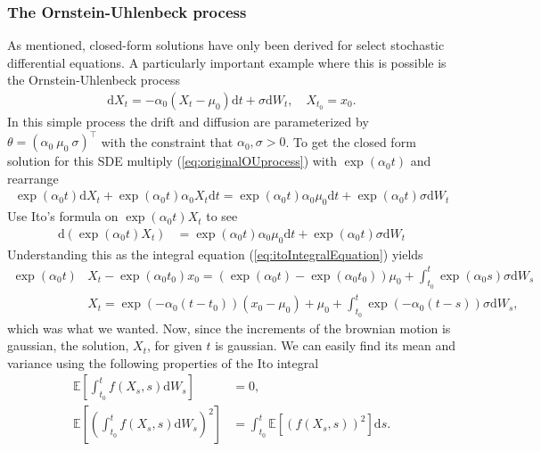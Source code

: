 \subsubsection{The Ornstein-Uhlenbeck process}
As mentioned, closed-form solutions have only been derived for select stochastic differential equations. A particularly important example where this is possible is the Ornstein-Uhlenbeck process
\begin{align}
    \mathrm{d}X_t = -\alpha_0\left(X_t - \mu_0\right)\mathrm{d}t + \sigma \mathrm{d}W_t, \quad X_{t_0} = x_0. \label{eq:originalOUprocess}
\end{align}
In this simple process the drift and diffusion are parameterized by $\theta = \left(\alpha_0\: \mu_0\:\sigma\right)^\top$ with the constraint that $\alpha_0, \sigma>0$.
To get the closed form solution for this SDE multiply (\ref{eq:originalOUprocess}) with $\exp\left(\alpha_0 t\right)$ and rearrange
\begin{align}
    \exp\left(\alpha_0 t\right)\mathrm{d}X_t + \exp\left(\alpha_0 t\right) \alpha_0 X_t \mathrm{d}t = \exp\left(\alpha_0 t\right)\alpha_0\mu_0 \mathrm{d}t + \exp\left(\alpha_0 t\right)\sigma \mathrm{d}W_t
\end{align}
Use Ito's formula on $\exp\left(\alpha_0 t\right)X_t$ to see
\begin{align}
    \mathrm{d}\left(\exp\left(\alpha_0 t\right)X_t\right) &= \exp\left(\alpha_0 t\right)\alpha_0 \mu_0 \mathrm{d}t + \exp\left(\alpha_0 t\right) \sigma \mathrm{d}W_t \nonumber
\end{align}
Understanding this as the integral equation (\ref{eq:itoIntegralEquation}) yields
\begin{align}
    \exp\left(\alpha_0 t\right)&X_t - \exp\left(\alpha_0 t_0\right)x_0 = \left(\exp\left(\alpha_0 t\right) - \exp\left(\alpha_0 t_0\right)\right)\mu_0 + \int_{t_0}^t \exp\left(\alpha_0 s\right)\sigma \mathrm{d}W_s \nonumber \\
    &X_t = \exp\left(-\alpha_0\left(t - t_0\right)\right)\left(x_0 - \mu_0\right) + \mu_0 + \int_{t_0}^t \exp\left(-\alpha_0 \left(t - s\right)\right)\sigma \mathrm{d}W_s \label{eq:OU_solution},
\end{align}
which was what we wanted. Now, since the increments of the brownian motion is gaussian, the solution, $X_t$, for given $t$ is gaussian. We can easily find its mean and variance using the following properties of the Ito integral \cite[theorem 3.2.1 and lemma 3.1.5]{Oksendal2003_yu}
\begin{align}
    \mathbb{E}\left[\int_{t_0}^t f(X_s, s) \mathrm{d}W_s\right] &= 0 \label{eq:meanOfItoIntegral},\\
    \mathbb{E}\left[\left(\int_{t_0}^t f(X_s, s) \mathrm{d}W_s\right)^2\right] &= \int_{t_0}^t \mathbb{E}\left[\left(f(X_s, s)\right)^2\right] \mathrm{d}s. \label{eq:ItoIsometry}
\end{align}
